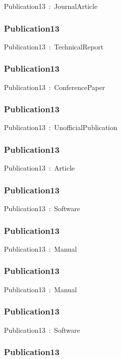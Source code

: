 \documentclass{article}
\begin{document}
Publication13~:~JournalArticle

\subsubsection*{Publication13}

Publication13~:~TechnicalReport

\subsubsection*{Publication13}

Publication13~:~ConferencePaper

\subsubsection*{Publication13}

Publication13~:~UnofficialPublication

\subsubsection*{Publication13}

Publication13~:~Article

\subsubsection*{Publication13}

Publication13~:~Software

\subsubsection*{Publication13}

Publication13~:~Manual

\subsubsection*{Publication13}

Publication13~:~Manual

\subsubsection*{Publication13}

Publication13~:~Software

\subsubsection*{Publication13}
\end{document}
